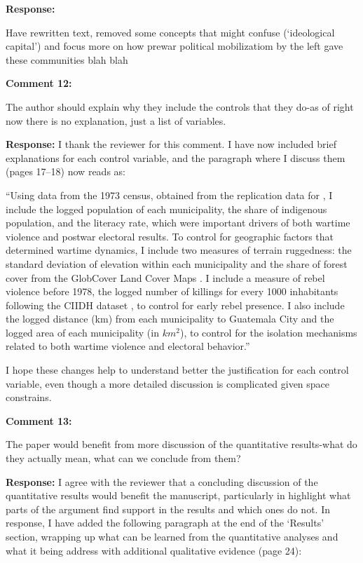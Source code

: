 \documentclass[12pt, a4paper, notitlepage]{article}
\begin{document}
\noindent\textbf{Response:} {}

Have rewritten text, removed some concepts that might confuse (`ideological capital') and focus more on how prewar political mobilizatiom by the left gave these communities blah blah

\vspace{15pt}
\noindent\textbf{Comment 12:}
\begin{displayquote}
The author should explain why they include the controls that they do-as of right now there is no explanation, just a list of variables.
\end{displayquote}

\noindent\textbf{Response:} I thank the reviewer for this comment. I have now included brief explanations for each control variable, and the paragraph where I discuss them (pages 17--18) now reads as:

``Using data from the 1973 census, obtained from the replication data for \citet{Sullivan:2012aa}, I include the logged population of each municipality, the share of indigenous population, and the literacy rate, which were important drivers of both wartime violence and postwar electoral results.
To control for geographic factors that determined wartime dynamics, I include two measures of terrain ruggedness: the standard deviation of elevation within each municipality \citep{Mapzen:2018aa} and the share of forest cover from the GlobCover Land Cover Maps \citep{Arino:2012aa}.
I include a measure of rebel violence before 1978, the logged number of killings for every 1000 inhabitants following the CIIDH dataset \citep{Ball:1999aa}, to control for early rebel presence.
I also include the logged distance (km) from each municipality to Guatemala City and the logged area of each municipality (in $km^2$), to control for the isolation mechanisms related to both wartime violence and electoral behavior.''

I hope these changes help to understand better the justification for each control variable, even though a more detailed discussion is complicated given space constrains.

\vspace{15pt}
\noindent\textbf{Comment 13:}
\begin{displayquote}
The paper would benefit from more discussion of the quantitative results-what do they actually mean, what can we conclude from them?
\end{displayquote}

\noindent\textbf{Response:} I agree with the reviewer that a concluding discussion of the quantitative results would benefit the manuscript, particularly in highlight what parts of the argument find support in the results and which ones do not. In response, I have added the following paragraph at the end of the `Results' section, wrapping up what can be learned from the quantitative analyses and what it being address with additional qualitative evidence (page 24):
\end{document}
